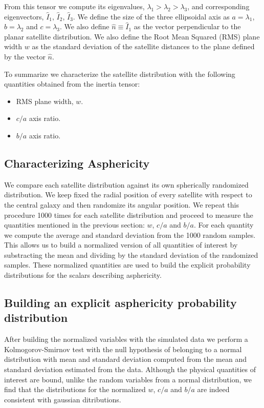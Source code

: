 \documentclass[a4paper,fleqn,usenatbib]{mnras}
\begin{document}
From this tensor we compute its eigenvalues,
$\lambda_1>\lambda_2>\lambda_3$, and corresponding eigenvectors,
$\hat{I}_1$, $\hat{I}_2$, $\hat{I}_3$.
We define the size of the three ellipsoidal axis as
$a=\lambda_1$, $b=\lambda_2$ and $c=\lambda_3$.
We also define $\hat{n}\equiv \hat{I}_1$ as the vector perpendicular to the
planar satellite distribution. 
We also define the Root Mean Squared (RMS) plane width $w$ as the
standard deviation of the satellite distances to the plane defined by
the vector $\hat{n}$.    

To summarize we characterize the satellite distribution with the following
quantities obtained from the inertia tensor: 
\begin{itemize}
\item RMS plane width, $w$.
\item $c/a$ axis ratio.
\item $b/a$ axis ratio.
\end{itemize}


\subsection{Characterizing Asphericity}

We compare each satellite distribution against its own spherically
randomized distribution.
We keep fixed the radial position of every satellite
with respect to the central galaxy and then randomize its angular
position. 
We repeat this procedure 1000 times for each satellite distribution
and proceed to measure the quantities mentioned in the previous section:
$w$, $c/a$ and $b/a$.
For each quantity we compute the average and standard deviation from
the 1000 random samples. 
This allows us to build a normalized version of all quantities of
interest by substracting the mean and dividing by the standard
deviation of the randomized samples.
These normalized quantities are used to build the explicit probability
distributions for the scalars describing asphericity.


\subsection{Building an explicit asphericity probability distribution}

After building the normalized variables with the simulated data we
perform a Kolmogorov-Smirnov test with the null hypothesis of belonging
to a normal distribution with mean and standard deviation computed
from the mean and standard deviation estimated from the data.
Although the physical quantities of interest are bound, unlike the
random variables from a normal distribution, we find that the
distributions for the normalized $w$, $c/a$ and $b/a$ are indeed
consistent with gaussian ditributions. 
\end{document}
